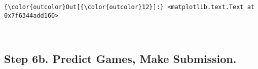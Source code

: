 \documentclass[11pt]{article}
\begin{document}
\begin{Verbatim}[commandchars=\\\{\}]
{\color{outcolor}Out[{\color{outcolor}12}]:} <matplotlib.text.Text at 0x7f6344add160>
\end{Verbatim}
            
    \begin{center}
    \end{center}
    { \hspace*{\fill} \\}
    
    \hypertarget{step-6b.-predict-games-make-submission.}{%
\subsection{Step 6b. Predict Games, Make
Submission.}\label{step-6b.-predict-games-make-submission.}}
\end{document}
